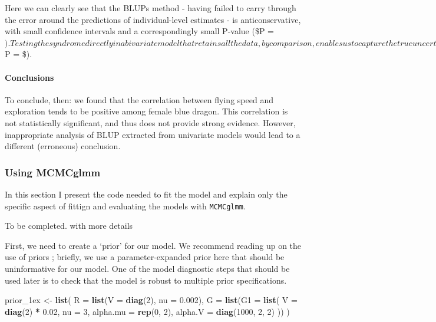 \documentclass[
  12pt,
]{book}
\newenvironment{Shaded}{\begin{snugshade}}{\end{snugshade}}
\newcommand{\DataTypeTok}[1]{\textcolor[rgb]{0.13,0.29,0.53}{#1}}
\newcommand{\DecValTok}[1]{\textcolor[rgb]{0.00,0.00,0.81}{#1}}
\newcommand{\FloatTok}[1]{\textcolor[rgb]{0.00,0.00,0.81}{#1}}
\newcommand{\KeywordTok}[1]{\textcolor[rgb]{0.13,0.29,0.53}{\textbf{#1}}}
\newcommand{\NormalTok}[1]{#1}
\newcommand{\OperatorTok}[1]{\textcolor[rgb]{0.81,0.36,0.00}{\textbf{#1}}}
\newcommand{\StringTok}[1]{\textcolor[rgb]{0.31,0.60,0.02}{#1}}
\begin{document}
Here we can clearly see that the BLUPs method - having failed to carry through the error around the predictions of individual-level estimates - is anticonservative, with small confidence intervals and a correspondingly small P-value (\$P = \(). Testing the syndrome directly in a bivariate model that retains all the data, by comparison, enables us to capture the true uncertainty about the estimate of the correlation. This is reflected in the larger confidence intervals and, in this case, the non-significant P-value (\)P = \$).

\hypertarget{conclusions-1}{%
\paragraph{Conclusions}\label{conclusions-1}}

To conclude, then: we found that the correlation between flying speed and exploration tends to be positive among female blue dragon. This correlation is not statistically significant, and thus does not provide strong evidence. However, inappropriate analysis of BLUP extracted from univariate models would lead to a different (erroneous) conclusion.

\hypertarget{using-mcmcglmm}{%
\subsubsection{Using MCMCglmm}\label{using-mcmcglmm}}

In this section I present the code needed to fit the model and explain only the specific aspect of fittign and evaluating the models with \texttt{MCMCglmm}.

To be completed. with more details

First, we need to create a `prior' for our model. We recommend reading up on the use of priors \citep[see the course notes of \texttt{MCMCglmm}][]{R-MCMCglmm}; briefly, we use a parameter-expanded prior here that should be uninformative for our model. One of the model diagnostic steps that should be used later is to check that the model is robust to multiple prior specifications.

\begin{Shaded}
\begin{Highlighting}[]
\NormalTok{prior\_1ex \textless{}{-}}\StringTok{ }\KeywordTok{list}\NormalTok{(}
  \DataTypeTok{R =} \KeywordTok{list}\NormalTok{(}\DataTypeTok{V =} \KeywordTok{diag}\NormalTok{(}\DecValTok{2}\NormalTok{), }\DataTypeTok{nu =} \FloatTok{0.002}\NormalTok{),}
  \DataTypeTok{G =} \KeywordTok{list}\NormalTok{(}\DataTypeTok{G1 =} \KeywordTok{list}\NormalTok{(}
    \DataTypeTok{V =} \KeywordTok{diag}\NormalTok{(}\DecValTok{2}\NormalTok{) }\OperatorTok{*}\StringTok{ }\FloatTok{0.02}\NormalTok{, }\DataTypeTok{nu =} \DecValTok{3}\NormalTok{,}
    \DataTypeTok{alpha.mu =} \KeywordTok{rep}\NormalTok{(}\DecValTok{0}\NormalTok{, }\DecValTok{2}\NormalTok{),}
    \DataTypeTok{alpha.V =} \KeywordTok{diag}\NormalTok{(}\DecValTok{1000}\NormalTok{, }\DecValTok{2}\NormalTok{, }\DecValTok{2}\NormalTok{)}
\NormalTok{  ))}
\NormalTok{)}
\end{Highlighting}
\end{Shaded}
\end{document}
